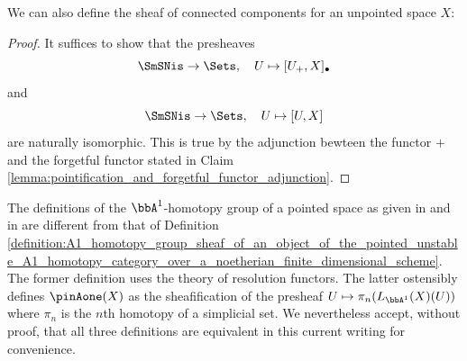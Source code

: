 

We can also define the sheaf of connected components for an unpointed space $X$:





\begin{proof}
    It suffices to show that the presheaves 
    $$\SmSNis \to \Sets, \quad U \mapsto [U_+, X]_\bullet$$
    and 
    $$\SmSNis \to \Sets, \quad U \mapsto [U, X]$$
    are naturally isomorphic. This is true by the adjunction bewteen the functor $+$ and the forgetful functor stated in Claim \ref{lemma:pointification_and_forgetful_functor_adjunction}.
\end{proof}

\begin{remark}
    The definitions of the $\bbA^1$-homotopy group of a pointed space as given in \cite{morel_voevodsky_1999} and in \cite[Section 6.3 after Conjecture 6.34]{morel_a1at} are different from that of Definition \ref{definition:A1_homotopy_group_sheaf_of_an_object_of_the_pointed_unstable_A1_homotopy_category_over_a_noetherian_finite_dimensional_scheme}. The former definition uses the theory of resolution functors. The latter ostensibly defines $\pinAone(X)$ as the sheafification of the presheaf $U \mapsto \pi_n(L_{\bbA^1}(X)(U))$ where $\pi_n$ is the $n$th homotopy of a simplicial set. We nevertheless accept, without proof, that all three definitions are equivalent in this current writing for convenience. 
\end{remark}












